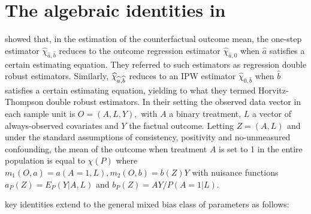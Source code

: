 \documentclass{article}
\begin{document}
\section{The algebraic identities in \cite{robins2007comment}}\label{sec:robins}

\cite{robins2007comment} showed that, in the estimation of the counterfactual outcome
mean, the one-step estimator $\widehat{\chi }_{\widehat{a},\widehat{b}}$
reduces to the outcome regression estimator $\widehat{\chi }_{\widehat{a},0}$
when $\widehat{a}$ satisfies a certain estimating equation. They referred to
such estimators as regression double robust estimators. Similarly, $\widehat{%
\chi }_{\widehat{a},\widehat{b}}$ reduces to an IPW estimator $\widehat{\chi 
}_{0,\widehat{b}}$ when $\widehat{b}$ satisfies a certain estimating
equation, yielding to what they termed Horvitz-Thompson double robust
estimators. In their setting the observed data vector in each sample unit is 
$O=\left( A,L,Y\right) ,$ with $A$ a binary treatment, $L$ a vector of
always-observed covariates and $Y$ the factual outcome. Letting $Z=\left(
A,L\right) \,\ $and under the standard assumptions of consistency,
positivity and no-unmeasured confounding, the mean of the outcome when
treatment $A$ is set to 1 in the entire population is equal to $\chi \left(
P\right) $ where $m_{1}\left( O,a\right) =a\left( A=1,L\right) ,m_{2}\left(
O,b\right) =b\left( Z\right) Y$ with nuisance functions $a_{P}\left(
Z\right) =E_{P}\left( Y|A,L\right) $ and $b_{P}\left( Z\right) =AY/P\left(
A=1|L\right) .$ 

\cite{robins2007comment} key identities extend to the general mixed bias class of
parameters as follows:
\end{document}
